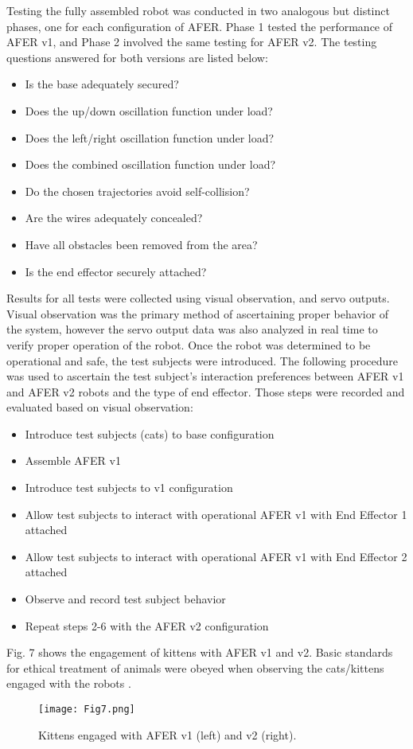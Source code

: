 Testing the fully assembled robot was conducted in two analogous but distinct phases, one for each configuration of AFER. Phase 1 tested the performance of AFER v1, and Phase 2 involved the same testing for AFER v2. The testing questions answered for both versions are listed below:
\begin{itemize}
\item Is the base adequately secured?
\item Does the up/down oscillation function under load?
\item Does the left/right oscillation function under load?
\item Does the combined oscillation function under load?
\item Do the chosen trajectories avoid self-collision?
\item Are the wires adequately concealed?
\item Have all obstacles been removed from the area?
\item Is the end effector securely attached?
\end{itemize}

Results for all tests were collected using visual observation, and servo outputs. Visual observation was the primary method of ascertaining proper behavior of the system, however the servo output data was also analyzed in real time to verify proper operation of the robot. Once the robot was determined to be operational and safe, the test subjects were introduced. 
The following procedure was used to ascertain the test subject’s interaction preferences between AFER v1 and AFER v2 robots and the type of end effector. Those steps were recorded and evaluated based on visual observation: 
\begin{itemize}
\item Introduce test subjects (cats) to base configuration
\item Assemble AFER v1
\item Introduce test subjects to v1 configuration
\item Allow test subjects to interact with operational AFER v1 with End Effector 1 attached
\item Allow test subjects to interact with operational AFER v1 with End Effector 2 attached
\item Observe and record test subject behavior
\item Repeat steps 2-6 with the AFER v2 configuration
\end{itemize}

Fig. 7 shows the engagement of kittens with AFER v1 and v2. Basic standards for ethical treatment of animals were obeyed when observing the cats/kittens engaged with the robots \cite{Brambell1965ReportOT}.

\begin{figure}[h!]
\texttt{[image: Fig7.png]}
\caption{Kittens engaged with AFER v1 (left) and v2 (right).}
\end{figure}

